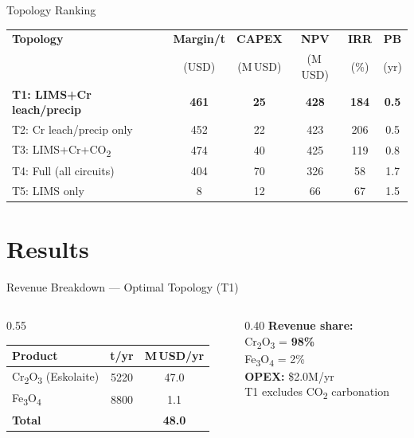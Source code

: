 \documentclass[aspectratio=169]{beamer}
\begin{document}
\begin{frame}{Topology Ranking}
\begin{table}
\centering
\small
\begin{tabular}{@{}lccccc@{}}
\toprule
\textbf{Topology} & \textbf{Margin/t} & \textbf{CAPEX} & \textbf{NPV} & \textbf{IRR} & \textbf{PB} \\
& (USD) & (M\,USD) & (M\,USD) & (\%) & (yr) \\
\midrule
\textbf{T1: LIMS+Cr leach/precip} & \textbf{461} & \textbf{25} & \textbf{428} & \textbf{184} & \textbf{0.5} \\
T2: Cr leach/precip only  & 452 & 22 & 423 & 206 & 0.5 \\
T3: LIMS+Cr+CO\textsubscript{2}          & 474 & 40 & 425 & 119 & 0.8 \\
T4: Full (all circuits)   & 404 & 70 & 326 &  58 & 1.7 \\
T5: LIMS only             &   8 & 12 &  66 &  67 & 1.5 \\
\bottomrule
\end{tabular}
\end{table}
\end{frame}

\section{Results}

\begin{frame}{Revenue Breakdown --- Optimal Topology (T1)}
\begin{columns}[T]
\begin{column}{0.55\textwidth}
\begin{table}
\centering
\begin{tabular}{@{}lcc@{}}
\toprule
\textbf{Product} & \textbf{t/yr} & \textbf{M\,USD/yr} \\
\midrule
Cr\textsubscript{2}O\textsubscript{3} (Eskolaite) & \num{5220} & \textcolor{StepGreen}{47.0} \\
Fe\textsubscript{3}O\textsubscript{4} & \num{8800} & \textcolor{StepGreen}{1.1} \\
\midrule
\textbf{Total} & & \textbf{\textcolor{StepGreen}{48.0}} \\
\bottomrule
\end{tabular}
\end{table}
\end{column}
\begin{column}{0.40\textwidth}
\textbf{Revenue share:}\\[0.5em]
Cr\textsubscript{2}O\textsubscript{3} = \textbf{98\%}\\
Fe\textsubscript{3}O\textsubscript{4} = 2\%\\[1em]
\textcolor{StepRed}{\textbf{OPEX:} \$2.0M/yr}\\[0.5em]
\textcolor{StepGrey}{T1 excludes CO\textsubscript{2} carbonation}
\end{column}
\end{columns}
\end{frame}
\end{document}
